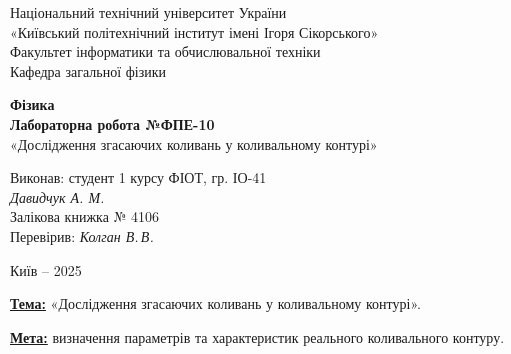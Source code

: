 \documentclass[12pt,a4paper]{article}
\begin{document}
    \begin{titlepage}

        \thispagestyle{empty}
        \begin{center}
        \large
        Національний технічний університет України\\
        «Київський політехнічний інститут імені Ігоря Сікорського»\\[1em]
        Факультет інформатики та обчислювальної техніки\\
        Кафедра загальної фізики
        \end{center}

        \vfill

        \begin{center}
        \textbf{\Large Фізика}\\[2em]
        \textbf{\Large Лабораторна робота №ФПЕ-10}\\
        «Дослідження згасаючих коливань у коливальному контурі» 
        \end{center}

        \vfill

        \begin{flushright}
        Виконав: студент 1 курсу ФІОТ, гр. ІО-41\\
        \textit{Давидчук А. М.}\\
        Залікова книжка № 4106\\[1em]
        Перевірив: \textit{Колган В.\,В.}
        \end{flushright}

        \vfill

        \begin{center}
        Київ -- 2025
        \end{center}

    \end{titlepage}

    \setlength{\parindent}{0pt}


    \textbf{\underline{Тема:}} «Дослідження згасаючих коливань у коливальному контурі».

    \vspace{1em} %

    \textbf{\underline{Мета:}} визначення параметрів та характеристик реального коливального контуру.

    \vspace{1em} %
\end{document}
